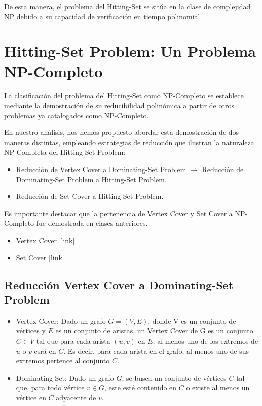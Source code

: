De esta manera, el problema del Hitting-Set se sitúa en la clase de complejidad NP debido a su capacidad de verificación en tiempo polinomial. 

\section{Hitting-Set Problem: Un Problema NP-Completo}

La clasificación del problema del Hitting-Set como NP-Completo se establece mediante la demostración
de su reducibilidad polinómica a partir de otros problemas ya catalogados como NP-Completo. 

En nuestro análisis, nos hemos propuesto abordar esta demostración de dos maneras distintas, 
empleando estrategias de reducción que ilustran la naturaleza NP-Completa del Hitting-Set Problem:

\begin{itemize}
    \item Reducción de Vertex Cover a Dominating-Set Problem $\rightarrow$ Reducción de Dominating-Set Problem a Hitting-Set Problem.
    \item Reducción de Set Cover a Hitting-Set Problem.
\end{itemize}


Es importante destacar que la pertenencia de Vertex Cover y Set Cover a NP-Completo fue demostrada en clases anteriores.
\begin{itemize}
    \item  Vertex Cover [link]
    \item Set Cover [link]
\end{itemize}


\subsection{Reducción Vertex Cover a Dominating-Set Problem}

\begin{itemize}
    \item Vertex Cover: Dado un grafo $G=(V,E)$, donde V es un conjunto de vértices y $E$ es un conjunto de aristas, un Vertex Cover de G es un conjunto $C \in V$ tal que para cada arista $(u,v)$ en $E$, al menos uno de los extremos de $u$ o $v$ esrá en $C$. Es decir, para cada arista en el grafo, al menos uno de sus extremos pertence al conjunto $C$. 
    \item Dominating Set: Dado un grafo $G$, se busca un conjunto de vértices $C$
    tal que, para todo vértice $v \in G$, este esté contenido en $C$ o existe al menos un vértice en $C$ adyacente de $v$.
\end{itemize}

